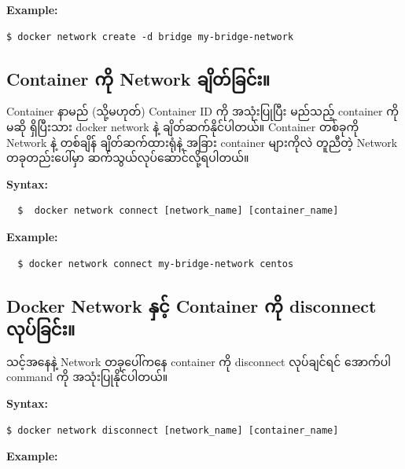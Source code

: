 \textbf{Example:}

\begin{verbatim}
$ docker network create -d bridge my-bridge-network
\end{verbatim}

\hypertarget{container-ux1000ux102dux102f-network-ux1001ux103bux102dux1010ux103aux1001ux103cux1004ux103aux1038}{%
\subsection{Container ကို Network
ချိတ်ခြင်း။}\label{container-ux1000ux102dux102f-network-ux1001ux103bux102dux1010ux103aux1001ux103cux1004ux103aux1038}}

Container နာမည် (သို့မဟုတ်) Container ID ကို အသုံးပြုပြီး မည်သည့်
container ကိုမဆို ရှိပြီးသား docker network နဲ့ ချိတ်ဆက်နိုင်ပါတယ်။
Container တစ်ခုကို Network နဲ့ တစ်ချိန် ချိတ်ဆက်ထားရုံနဲ့ အခြား
container များကိုလဲ တူညီတဲ့ Network တခုတည်းပေါ်မှာ
ဆက်သွယ်လုပ်ဆောင်လို့ရပါတယ်။

\textbf{Syntax:}

\begin{verbatim}
  $  docker network connect [network_name] [container_name]
\end{verbatim}

\textbf{Example:}

\begin{verbatim}
  $ docker network connect my-bridge-network centos
\end{verbatim}

\hypertarget{docker-network-ux1014ux103eux1004ux103aux1037-container-ux1000ux102dux102f-disconnect-ux101cux102fux1015ux103aux1001ux103cux1004ux103aux1038}{%
\subsection{Docker Network နှင့် Container ကို disconnect
လုပ်ခြင်း။}\label{docker-network-ux1014ux103eux1004ux103aux1037-container-ux1000ux102dux102f-disconnect-ux101cux102fux1015ux103aux1001ux103cux1004ux103aux1038}}

သင့်အနေနဲ့ Network တခုပေါ်ကနေ container ကို disconnect လုပ်ချင်ရင်
အောက်ပါ command ကို အသုံးပြုနိုင်ပါတယ်။

\textbf{Syntax:}

\begin{verbatim}
$ docker network disconnect [network_name] [container_name]
\end{verbatim}

\textbf{Example:}

